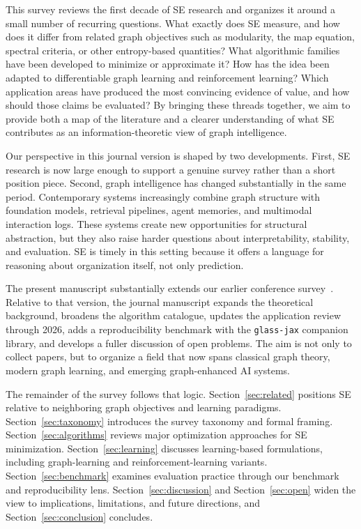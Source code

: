 This survey reviews the first decade of SE research and organizes it around a
small number of recurring questions.
What exactly does SE measure, and how does it differ from related graph
objectives such as modularity, the map equation, spectral criteria, or other
entropy-based quantities?
What algorithmic families have been developed to minimize or approximate it?
How has the idea been adapted to differentiable graph learning and
reinforcement learning?
Which application areas have produced the most convincing evidence of value,
and how should those claims be evaluated?
By bringing these threads together, we aim to provide both a map of the
literature and a clearer understanding of what SE contributes as an
information-theoretic view of graph intelligence.

Our perspective in this journal version is shaped by two developments.
First, SE research is now large enough to support a genuine survey rather than
a short position piece.
Second, graph intelligence has changed substantially in the same period.
Contemporary systems increasingly combine graph structure with foundation
models, retrieval pipelines, agent memories, and multimodal interaction logs.
These systems create new opportunities for structural abstraction, but they
also raise harder questions about interpretability, stability, and
evaluation.
SE is timely in this setting because it offers a language for reasoning about
organization itself, not only prediction.

The present manuscript substantially extends our earlier conference
survey~\cite{su2025ijcai}.
Relative to that version, the journal manuscript expands the theoretical
background, broadens the algorithm catalogue, updates the application review
through 2026, adds a reproducibility benchmark with the \texttt{glass-jax}
companion library, and develops a fuller discussion of open problems.
The aim is not only to collect papers, but to organize a field that now spans
classical graph theory, modern graph learning, and emerging graph-enhanced AI
systems.

The remainder of the survey follows that logic.
Section~\ref{sec:related} positions SE relative to neighboring graph
objectives and learning paradigms.
Section~\ref{sec:taxonomy} introduces the survey taxonomy and formal framing.
Section~\ref{sec:algorithms} reviews major optimization approaches for SE
minimization.
Section~\ref{sec:learning} discusses learning-based formulations, including
graph-learning and reinforcement-learning variants.
Section~\ref{sec:benchmark} examines evaluation practice through our benchmark
and reproducibility lens.
Section~\ref{sec:discussion} and Section~\ref{sec:open} widen the view to
implications, limitations, and future directions, and
Section~\ref{sec:conclusion} concludes.
